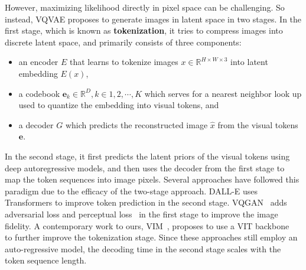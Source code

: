 However, maximizing likelihood directly in pixel space can be challenging. So instead,
VQVAE \cite{Oord17vqvae, Razavi19vqvae2} proposes to generate images in latent space in two stages. In the first stage, which is known as \textbf{tokenization}, it tries to compress images into discrete latent space, and primarily consists of three components:\vspace{-2.5mm}
\begin{itemize}
    \item an encoder $E$ that learns to tokenize images $x \in \mathbb{R}^{H\times W \times 3}$ into latent embedding $E(x)$, \vspace{-2.5mm}
    \item a codebook $\mathbf{e}_k \in \mathbb{R}^D, k\in 1, 2, \cdots, K$ which serves for a nearest neighbor look up used to quantize the embedding into visual tokens, and  \vspace{-2.5mm}
    \item a decoder $G$ which predicts the reconstructed image $\hat{x}$ from the visual tokens $\mathbf{e}$. 
\end{itemize}\vspace{-1mm}

\noindent In the second stage, it first predicts the latent priors of the visual tokens using deep autoregressive models, and then uses the decoder from the first stage to map the token sequences into image pixels. Several approaches have followed this paradigm due to the efficacy of the two-stage approach. DALL-E \cite{Ramesh21dalle} uses Transformers \cite{Vaswani17attention} to improve token prediction in the second stage. VQGAN~\cite{Esser21vqgan} adds adversarial loss and perceptual loss~\cite{johnson2016perceptual, zhang2018unreasonable} in the first stage to improve the image fidelity. A contemporary work to ours, VIM~\cite{vim2021}, proposes to use a VIT backbone ~\cite{dosovitskiy2021vit} to further improve the tokenization stage. Since these approaches still employ an auto-regressive model, the decoding time in the second stage scales with the token sequence length. 

